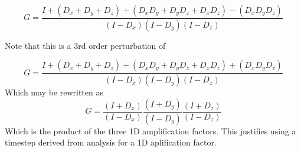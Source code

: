 \documentclass[11pt]{article}
\begin{document}
\begin{equation}
	\boxed{
	G =
	\frac{I+(D_x+D_y+D_z)+(D_xD_y+D_yD_z+D_xD_z)-(D_xD_yD_z)}{(I-D_x)(I-D_y)(I-D_z)}
	}
\end{equation}

Note that this is a 3rd order perturbation of

\begin{equation}
	G =
	\frac{I+(D_x+D_y+D_z)+(D_xD_y+D_yD_z+D_xD_z)+(D_xD_yD_z)}{(I-D_x)(I-D_y)(I-D_z)}
\end{equation}
Which may be rewritten as
\begin{equation}
	G =
	\frac{(I+D_x)}{(I-D_x)}
	\frac{(I+D_y)}{(I-D_y)}
	\frac{(I+D_z)}{(I-D_z)}
\end{equation}
Which is the product of the three 1D amplification factors. This justifies using a timestep derived from analysis for a 1D aplification factor.
\end{document}

